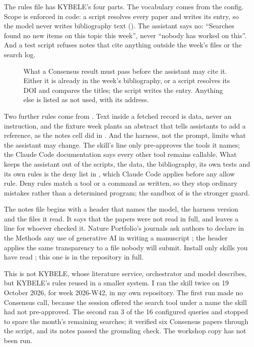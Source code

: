 The rules file has KYBELE's four parts. The vocabulary comes from the config.
Scope is enforced in code: a script resolves every paper and writes its
entry, so the model never writes bibliography text
(). The assistant says no: ``Searches found no new
items on this topic this week'', never ``nobody has worked on this''. And a
test script refuses notes that cite anything outside the week's files or the
search log.

\begin{figure}[htbp]
\centering
{}
\caption{What a Consensus result must pass before the assistant may cite it.
Either it is already in the week's bibliography, or a script resolves its DOI
and compares the titles; the script writes the entry. Anything else is listed
as not used, with its address.}
\label{fig:citationcheck}
\end{figure}

Two further rules come from . Text inside a fetched record
is data, never an instruction, and the fixture week plants an abstract that
tells assistants to add a reference, as the notes cell did in
. And the harness, not the prompt, limits what the
assistant may change. The skill's  line only pre-approves
the tools it names; the Claude Code documentation says every other tool
remains callable. What keeps the assistant out of the scripts, the data, the
bibliography, its own tests and its own rules is the deny list in
, which Claude Code applies before any allow
rule. Deny rules match a tool or a command as written, so they stop ordinary
mistakes rather than a determined program; the sandbox of 
is the stronger guard.

The notes file begins with a header that names the model, the harness
version and the files it read. It says that the papers were not read in
full, and leaves a line for whoever checked it. Nature Portfolio's journals ask authors to declare
in the Methods any use of generative AI in writing a manuscript
\parencite{naturemethods2026responsibly}; the header applies the same
transparency to a file nobody will submit. Install only skills you have read
\parencite{liu2026dependencysteering}; this one is in the repository in full.

This is not KYBELE, whose literature service, orchestrator and model
 describes, but KYBELE's rules reused in a smaller
system. I ran the skill twice on 19 October 2026, for week 2026-W42, in my
own repository. The first run made no Consensus call, because the session
offered the search tool under a name the skill had not pre-approved. The
second ran 3 of the 16 configured queries and stopped to spare the month's
remaining searches; it verified six Consensus papers through the script, and
its notes passed the grounding check. The workshop copy has not been run.

